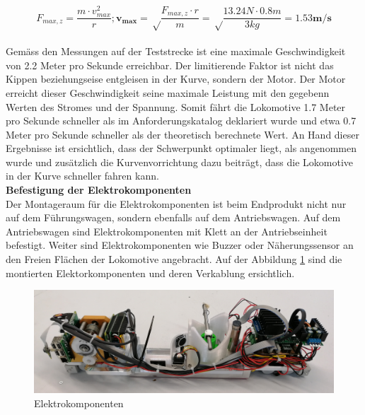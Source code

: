 \documentclass[../../main.tex]{subfiles}
\begin{document}
$$F_{max, z}=\frac{m \cdot v_{max}^2}{r};\boldsymbol{v_{max}}=\sqrt\frac{F_{max, z}\cdot r}{m}=\sqrt\frac{13.24N \cdot 0.8m}{3kg}=\boldsymbol{1.53m/s}$$\\

Gemäss den Messungen auf der Teststrecke ist eine maximale Geschwindigkeit von 2.2 Meter pro Sekunde erreichbar. Der limitierende Faktor ist nicht das Kippen beziehungseise entgleisen in der Kurve, sondern der Motor. Der Motor erreicht dieser Geschwindigkeit seine maximale Leistung mit den gegebenn Werten des Stromes und der Spannung. Somit fährt die Lokomotive 1.7 Meter pro Sekunde schneller als im Anforderungskatalog deklariert wurde und etwa 0.7 Meter pro Sekunde schneller als der theoretisch berechnete Wert. An Hand dieser Ergebnisse ist ersichtlich, dass der Schwerpunkt optimaler liegt, als angenommen wurde und zusätzlich die Kurvenvorrichtung dazu beiträgt, dass die Lokomotive in der Kurve schneller fahren kann.\\

\textbf{Befestigung der Elektrokomponenten}\\
Der Montageraum für die Elektrokomponenten ist beim Endprodukt nicht nur auf dem Führungswagen, sondern ebenfalls auf dem Antriebswagen. Auf dem Antriebswagen sind Elektrokomponenten mit Klett an der Antriebseinheit befestigt. Weiter sind Elektrokomponenten wie Buzzer oder Näherungssensor an den Freien Flächen der Lokomotive angebracht. Auf der Abbildung \ref{fig:elektrokomponenten} sind die montierten Elektorkomponenten und deren Verkablung ersichtlich.\\

\begin{figure}[H]
  \centering
  \includegraphics[width=1\textwidth]{lokomotive3.PNG}
  \caption {Elektrokomponenten}
  \label{fig:elektrokomponenten}
\end{figure}
\end{document}
